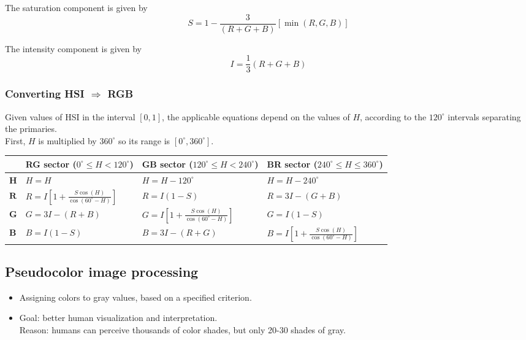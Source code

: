 The saturation component is given by
\begin{equation}
	S = 1 - \frac{3}{(R+G+B)} \left[ \min(R,G,B) \right]
\end{equation}

The intensity component is given by
\begin{equation}
	I = \frac{1}{3}(R+G+B)
\end{equation}

\subsubsection{Converting HSI $\Rightarrow$ RGB }
Given values of HSI in the interval $[0,1]$, the applicable equations depend on the values of $H$, according to the $120^{\circ}$ intervals separating the primaries.\\

First, $H$ is multiplied by $360^{\circ}$ so its range is $[0^{\circ},360^{\circ}]$. \\

\begin{tabularx}{\linewidth}{|l|X|X|X|}
	\hline
	& \textbf{RG sector} ($0^{\circ} \leq H < 120^{\circ}$) & \textbf{GB sector} ($120^{\circ} \leq H < 240^{\circ}$) & \textbf{BR sector} ($240^{\circ} \leq H \leq 360^{\circ}$) \\ \hline
	$\mathbf{H}$ & $H = H$ & $H = H-120^{\circ}$ & $H = H-240^{\circ}$ \\ \hline
	$\mathbf{R}$ & $R = I \left[ 1 + \frac{S \cos(H)}{\cos(60^{\circ} - H)} \right]$ & $R = I(1-S)$ & $R = 3I - (G+B)$ \\
	$\mathbf{G}$ & $G = 3I - (R+B)$ & $G = I \left[ 1 + \frac{S \cos(H)}{\cos(60^{\circ} - H)} \right]$ & $G = I(1-S)$ \\
	$\mathbf{B}$ & $B = I(1-S)$ & $B = 3I - (R+G)$ & $B = I \left[ 1 + \frac{S \cos(H)}{\cos(60^{\circ} - H)} \right]$ \\
	\hline
\end{tabularx}


\subsection{Pseudocolor image processing }
\begin{itemize}
	\item Assigning colors to gray values, based on a specified criterion.
	\item Goal: better human visualization and interpretation. \\
			Reason: humans can perceive thousands of color shades, but only 20-30 shades of gray.
\end{itemize}

